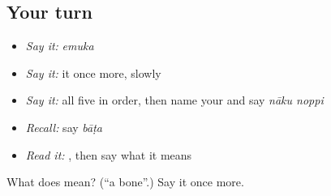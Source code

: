 \subsection*{Your turn}
\begin{itemize}
\raggedright
  \item \emph{Say it:} \emph{emuka}
  \item \emph{Say it:} it once more, slowly
  \item \emph{Say it:} all five in order, then name your  and say \emph{nāku noppi}
  \item \emph{Recall:} say \emph{bāṭa}
  \item \emph{Read it:} \textbf{}, then say what it means
\end{itemize}

\begin{tcolorbox}[breakable,colback=teal!4,colframe=teal!35!black,title={Before you move on}]
What does  mean? (\textquotedblleft{}a bone\textquotedblright{}.) Say it once more.
\end{tcolorbox}
